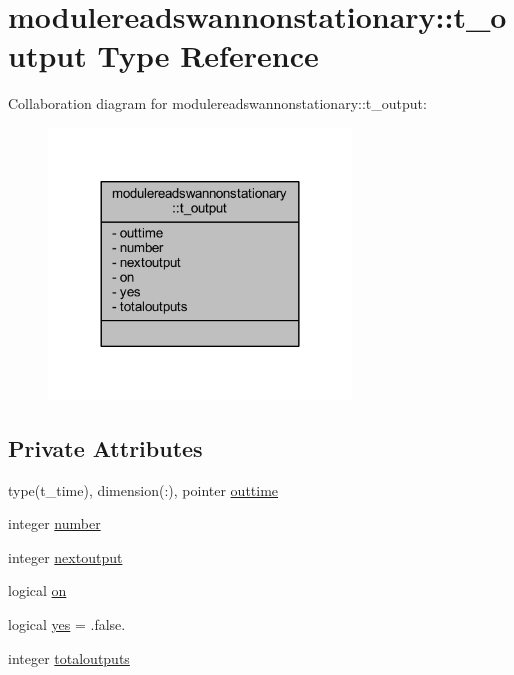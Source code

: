 \hypertarget{structmodulereadswannonstationary_1_1t__output}{}\section{modulereadswannonstationary\+:\+:t\+\_\+output Type Reference}
\label{structmodulereadswannonstationary_1_1t__output}


Collaboration diagram for modulereadswannonstationary\+:\+:t\+\_\+output\+:\nopagebreak
\begin{figure}[H]
\begin{center}
\leavevmode
\includegraphics[width=228pt]{structmodulereadswannonstationary_1_1t__output__coll__graph}
\end{center}
\end{figure}
\subsection*{Private Attributes}
\begin{DoxyCompactItemize}
\item 
type(t\+\_\+time), dimension(\+:), pointer \mbox{\hyperlink{structmodulereadswannonstationary_1_1t__output_a7a3eaded3f02170a42f2fe980a612df0}{outtime}}
\item 
integer \mbox{\hyperlink{structmodulereadswannonstationary_1_1t__output_a04b4cb3b810375c055c1dda1c9fb3763}{number}}
\item 
integer \mbox{\hyperlink{structmodulereadswannonstationary_1_1t__output_a82fe140e58690a9679572f0947369a2a}{nextoutput}}
\item 
logical \mbox{\hyperlink{structmodulereadswannonstationary_1_1t__output_aa081e5ec31724008e0f0af20c1e3a0bd}{on}}
\item 
logical \mbox{\hyperlink{structmodulereadswannonstationary_1_1t__output_a96ba4e3a24c79c05aebcb17f126c0382}{yes}} = .false.
\item 
integer \mbox{\hyperlink{structmodulereadswannonstationary_1_1t__output_a01c015285803eed4a54996e5410638dd}{totaloutputs}}
\end{DoxyCompactItemize}



